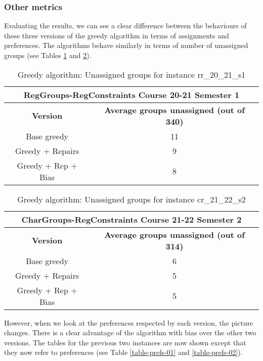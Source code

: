 \subsubsection{Other metrics}

Evaluating the results, we can see a clear difference between the behaviours of these three versions of the greedy algorithm in terms of assignments and preferences. The algorithms behave similarly in terms of number of unassigned groups (see Tables \ref{table-assign-01} and \ref{table-assign-02}). 


\begin{table}[H]
    \centering
    \caption{Greedy algorithm: Unassigned groups for instance rr\_20\_21\_s1}
    \label{table-assign-01}
    \begin{tabular}{|c|c|}
        \hline
        \multicolumn{2}{|c|}{\textbf{RegGroups-RegConstraints Course 20-21 Semester 1}} \\
        \hline
        \textbf{Version} & \textbf{Average groups unassigned (out of 340)} \\
        \hline
        \rowcolor{blue!30}
        Base greedy & 11 \\
        \rowcolor{blue!10}
        Greedy + Repairs & 9 \\
        \rowcolor{blue!30}
        Greedy + Rep + Bias & 8 \\
        \hline
    \end{tabular}
\end{table}


\begin{table}[H]
    \centering
    \caption{Greedy algorithm: Unassigned groups for instance cr\_21\_22\_s2}
    \label{table-assign-02}
    \begin{tabular}{|c|c|}
        \hline
        \multicolumn{2}{|c|}{\textbf{CharGroups-RegConstraints Course 21-22 Semester 2}} \\
        \hline
        \textbf{Version} & \textbf{Average groups unassigned (out of 314)} \\
        \hline
        \rowcolor{blue!30}
        Base greedy & 6 \\
        \rowcolor{blue!10}
        Greedy + Repairs & 5 \\
        \rowcolor{blue!30}
        Greedy + Rep + Bias & 5 \\
        \hline
    \end{tabular}
\end{table}

However, when we look at the preferences respected by each version, the picture changes. There is a clear advantage of the algorithm with bias over the other two versions. The tables for the previous two instances are now shown except that they now refer to preferences (see Table \ref{table-prefs-01} and \ref{table-prefs-02}).


